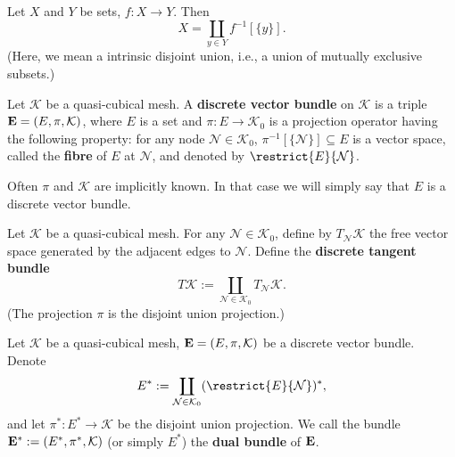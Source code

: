 \begin{proposition}
  Let $X$ and $Y$ be sets, $f \colon X \to Y$.
  Then
  \begin{equation}
    X = \coprod_{y \in Y} f^{-1}[\{y\}].
  \end{equation}
  (Here, we mean a intrinsic disjoint union, i.e., a union of mutually exclusive
  subsets.)
\end{proposition}
\begin{definition}
  Let $\mathcal{K}$ be a quasi-cubical mesh.
  A \textbf{discrete vector bundle} on $\mathcal{K}$ is a triple
  ${\bf E} = (E, \pi, \mathcal{K})$,
  where $E$ is a set and $\pi \colon E \to \mathcal{K}_0$ is a projection
  operator having the following property:
  for any node $\mathcal{N} \in \mathcal{K}_0$,
  $\pi^{-1}[\{\mathcal{N}\}] \subseteq E$ is a vector space, called the
  \textbf{fibre} of $E$ at $\mathcal{N}$,
  and denoted by $\restrict{E}{\mathcal{N}}$.

  Often $\pi$ and $\mathcal{K}$ are implicitly known.
  In that case we will simply say that $E$ is a discrete vector bundle.
\end{definition}
\begin{example}
  Let $\mathcal{K}$ be a quasi-cubical mesh.
  For any $\mathcal{N} \in \mathcal{K}_0$, define by $T_\mathcal{N} \mathcal{K}$
  the free vector space generated by the adjacent edges to $\mathcal{N}$.
  Define the \textbf{discrete tangent bundle}
  \begin{equation}
    T \mathcal{K}
    := \coprod_{\mathcal{N} \in \mathcal{K}_0} T_\mathcal{N} \mathcal{K}.
  \end{equation}
  (The projection $\pi$ is the disjoint union projection.)
\end{example}
\begin{definition}
  Let $\mathcal{K}$ be a quasi-cubical mesh,
  ${\bf E} = (E, \pi, \mathcal{K})$ be a discrete vector bundle.
  Denote
  \begin{equation}
    E^*
    := \coprod_{\mathcal{N} \in \mathcal{K}_0} (\restrict{E}{\mathcal{N}})^*,
  \end{equation}
  and let $\pi^* \colon E^* \to \mathcal{K}$ be the disjoint union projection.
  We call the bundle ${\bf E}^* := (E^*, \pi^*, \mathcal{K})$ (or simply $E^*$)
  the \textbf{dual bundle} of ${\bf E}$.
\end{definition}
